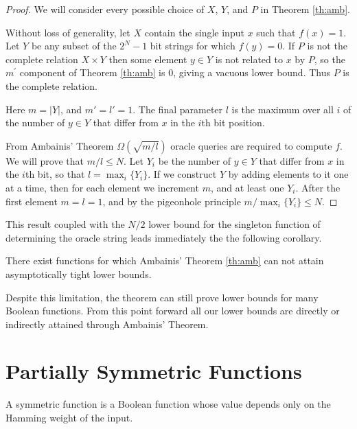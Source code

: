 \begin{proof}
We will consider every possible choice of $X$, $Y$, and $P$ in Theorem
\ref{th:amb}.

Without loss of generality, let $X$ contain the single input $x$ such
that $f(x) = 1$.  Let $Y$ be any subset of the $2^{N} - 1$ bit strings
for which $f(y) = 0$.  If $P$ is not the complete relation $X \times
Y$ then some element $y \in Y$ is not related to $x$ by $P$, so the
$m^{\prime}$ component of Theorem \ref{th:amb} is $0$, giving a
vacuous lower bound.  Thus $P$ is the complete relation.

Here $m = |Y|$, and $m' = l' = 1$.  The final parameter $l$ is the
maximum over all $i$ of the number of $y \in Y$ that differ from $x$
in the $i$th bit position.

From Ambainis' Theorem $\Omega(\sqrt{m/l})$ oracle queries are
required to compute $f$.  We will prove that $m/l \le N$.  Let $Y_{i}$
be the number of $y \in Y$ that differ from $x$ in the $i$th bit, so
that $l = \max_{i}\{Y_{i}\}$.  If we construct $Y$ by adding elements
to it one at a time, then for each element we increment $m$, and at
least one $Y_{i}$.  After the first element $m = l = 1$, and by the
pigeonhole principle $m/\max_{i}\{Y_{i}\} \le N$.
\end{proof}

This result coupled with the $N/2$ lower bound for the singleton
function of determining the oracle string leads immediately the the
following corollary.

\begin{corollary}
\label{cor:ambbad}
There exist functions for which Ambainis' Theorem \ref{th:amb} can not
attain asymptotically tight lower bounds.
\end{corollary}

Despite this limitation, the theorem can still prove lower bounds for
many Boolean functions.  From this point forward all our lower bounds
are directly or indirectly attained through Ambainis' Theorem.

\section{Partially Symmetric Functions} 
\label{sec:lqbsym}

\begin{defi}
\label{def:sym}
A symmetric function is a Boolean function whose value depends only on
the Hamming weight of the input.
\end{defi}

